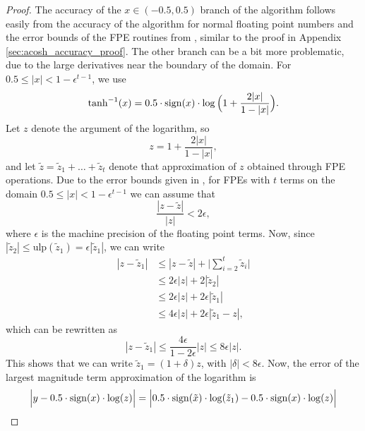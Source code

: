 \begin{proof}
    The accuracy of the $x \in (-0.5, 0.5)$ branch of the algorithm follows easily from the accuracy of the algorithm for normal floating point numbers and the error bounds of the FPE routines from \cite{popescu2017towards}, similar to the proof in Appendix \ref{sec:acosh_accuracy_proof}. The other branch can be a bit more problematic, due to the large derivatives near the boundary of the domain. For $0.5 \leq |x| < 1 - \epsilon^{t-1}$, we use
    \begin{equation}
        \tanh^{-1} (x) = 0.5 \cdot \operatorname{sign}(x) \cdot \log \Big( 1 + \frac{2 |x|}{1 - |x|} \Big).
    \end{equation}
    Let $z$ denote the argument of the logarithm, so
    \begin{equation}
        z = 1 + \frac{2|x|}{1 - |x|},
    \end{equation}
    and let $\tilde{z} = \tilde{z}_1 + \ldots + \tilde{z}_t$ denote that approximation of $z$ obtained through FPE operations. Due to the error bounds given in \citep{popescu2017towards}, for FPEs with $t$ terms on the domain $0.5 \leq |x| < 1 - \epsilon^{t-1}$ we can assume that
    \begin{equation}
        \frac{|z - \tilde{z}|}{|z|} < 2 \epsilon,
    \end{equation}
    where $\epsilon$ is the machine precision of the floating point terms. Now, since $|\tilde{z}_2| \leq \text{ulp}(\tilde{z}_1) = \epsilon |\tilde{z}_1|$, we can write
    \begin{align}
        |z - \tilde{z}_1| &\leq |z - \tilde{z}| + \Big| \sum_{i=2}^t \tilde{z}_i \Big| \\
        &\leq 2\epsilon |z| + 2 |\tilde{z}_2| \\
        &\leq 2\epsilon |z| + 2 \epsilon |\tilde{z}_1| \\
        &\leq 4\epsilon |z| + 2 \epsilon |\tilde{z}_1 - z|,
    \end{align}
    which can be rewritten as 
    \begin{equation}
        |z - \tilde{z}_1| \leq \frac{4\epsilon}{1 - 2\epsilon} |z| \leq 8\epsilon |z|.
    \end{equation}
    This shows that we can write $\tilde{z}_1 = (1 + \delta) z$, with $|\delta| < 8 \epsilon$. Now, the error of the largest magnitude term approximation of the logarithm is
    \begin{align}
        \Big| y - 0.5 \cdot \sign(x) \cdot \log (z) \Big| &= \Big| 0.5 \cdot \sign(\tilde{x}) \cdot \log (\tilde{z}_1) - 0.5 \cdot \sign(x) \cdot \log (z) \Big| \\

\end{align}
\end{proof}
